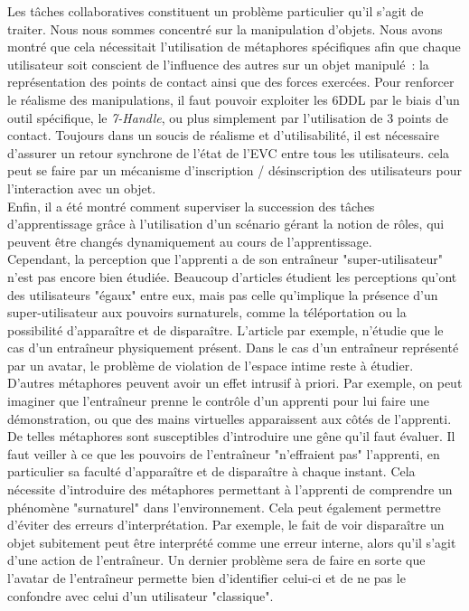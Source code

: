 \documentclass[11pt]{article}
\begin{document}
Les tâches collaboratives constituent un problème particulier qu'il s'agit de traiter. Nous nous sommes concentré sur la manipulation d'objets. Nous avons montré que cela nécessitait l'utilisation de métaphores spécifiques afin que chaque utilisateur soit conscient de l'influence des autres sur un objet manipulé~: la représentation des points de contact ainsi que des forces exercées. Pour renforcer le réalisme des manipulations, il faut pouvoir exploiter les 6DDL par le biais d'un outil spécifique, le \textit{7-Handle}, ou plus simplement par l'utilisation de 3 points de contact. Toujours dans un soucis de réalisme et d'utilisabilité, il est nécessaire d'assurer un retour synchrone de l'état de l'EVC entre tous les utilisateurs. cela peut se faire par un mécanisme d'inscription / désinscription des utilisateurs pour l'interaction avec un objet.
\\

Enfin, il a été montré comment superviser la succession des tâches d'apprentissage grâce à l'utilisation d'un scénario gérant la notion de rôles, qui peuvent être changés dynamiquement au cours de l'apprentissage.
\\

Cependant, la perception que l'apprenti a de son entraîneur "super-utilisateur" n'est pas encore bien étudiée. Beaucoup d'articles étudient les perceptions qu'ont des utilisateurs "égaux" entre eux, mais pas celle qu'implique la présence d'un super-utilisateur aux pouvoirs surnaturels, comme la téléportation ou la possibilité d'apparaître et de disparaître. L'article \cite{show-through} par exemple, n'étudie que le cas d'un entraîneur physiquement présent. Dans le cas d'un entraîneur représenté par un avatar, le problème de violation de l'espace intime reste à étudier. D'autres métaphores peuvent avoir un effet intrusif à priori. Par exemple, on peut imaginer que l'entraîneur prenne le contrôle d'un apprenti pour lui faire une démonstration, ou que des mains virtuelles apparaissent aux côtés de l'apprenti. De telles métaphores sont susceptibles d'introduire une gêne qu'il faut évaluer. Il faut veiller à ce que les pouvoirs de l'entraîneur "n'effraient pas" l'apprenti, en particulier sa faculté d'apparaître et de disparaître à chaque instant. Cela nécessite d'introduire des métaphores permettant à l'apprenti de comprendre un phénomène "surnaturel" dans l'environnement. Cela peut également permettre d'éviter des erreurs d'interprétation. Par exemple, le fait de voir disparaître un objet subitement peut être interprété comme une erreur interne, alors qu'il s'agit d'une action de l'entraîneur. Un dernier problème sera de faire en sorte que l'avatar de l'entraîneur permette bien d'identifier celui-ci et de ne pas le confondre avec celui d'un utilisateur "classique".


 
\end{document}

